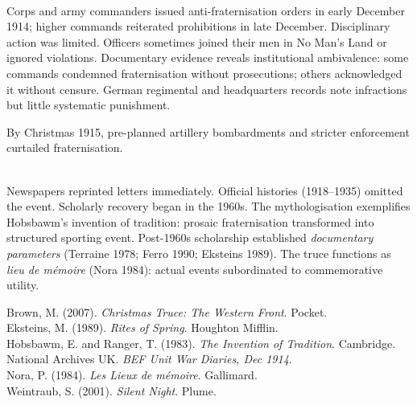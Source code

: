 \begin{technical}
\\[0.5em]
Corps and army commanders issued anti-fraternisation orders in early December 1914; higher commands reiterated prohibitions in late December. Disciplinary action was limited. Officers sometimes joined their men in No Man's Land or ignored violations. Documentary evidence reveals institutional ambivalence: some commands condemned fraternisation without prosecutions; others acknowledged it without censure. German regimental and headquarters records note infractions but little systematic punishment.

By Christmas 1915, pre-planned artillery bombardments and stricter enforcement curtailed fraternisation. 

\\[0.5em]
Newspapers reprinted letters immediately. Official histories (1918–1935) omitted the event. Scholarly recovery began in the 1960s. The mythologisation exemplifies Hobsbawm's \QSOpen{}invention of tradition\QSClose{}: prosaic fraternisation transformed into structured sporting event. Post-1960s scholarship established \textit{documentary parameters} (Terraine 1978; Ferro 1990; Eksteins 1989). The truce functions as \textit{lieu de mémoire} (Nora 1984): actual events subordinated to commemorative utility.

\techref
{\footnotesize
Brown, M. (2007). \textit{Christmas Truce: The Western Front}. Pocket.\\
Eksteins, M. (1989). \textit{Rites of Spring}. Houghton Mifflin.\\
Hobsbawm, E. and Ranger, T. (1983). \textit{The Invention of Tradition}. Cambridge.\\
National Archives UK. \textit{BEF Unit War Diaries, Dec 1914}.\\
Nora, P. (1984). \textit{Les Lieux de mémoire}. Gallimard.\\
Weintraub, S. (2001). \textit{Silent Night}. Plume.
}
\end{technical}
